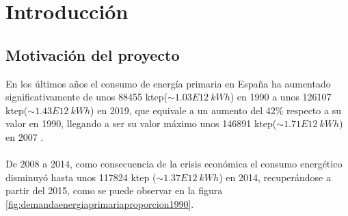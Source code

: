 \chapter{Introducción}


\section{Motivación del proyecto}

En los últimos años el consumo de energía primaria en España ha aumentado significativamente de unos 88455 ktep($\sim1.03E12 \ kWh$) en 1990 a unos 126107 ktep($\sim 1.43E12 \ kWh$) en 2019, que equivale a un aumento del 42\% respecto a su valor en 1990, llegando a ser su valor máximo unos 146891 ktep($\sim 1.71E12 \ kWh$) en 2007 \cite{libroEnergiaEnEspana2019}.\\\\
De 2008 a 2014, como consecuencia de la crisis económica el consumo energético disminuyó hasta unos 117824 ktep ($\sim 1.37E12 \ kWh$) en 2014, recuperándose a partir del 2015, como se puede observar en la figura \ref{fig:demandaenergiaprimariaproporcion1990}. \\


